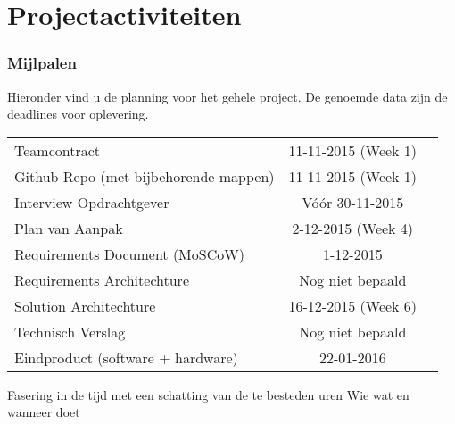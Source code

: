 \chapter{Projectactiviteiten}

\subsection{Mijlpalen}
Hieronder vind u de planning voor het gehele project. De genoemde data zijn de deadlines voor oplevering.
\begin{table}[]
\centering
\begin{tabular}{ l c r }
  Teamcontract & 11-11-2015 (Week 1) \\
  Github Repo (met bijbehorende mappen) & 11-11-2015 (Week 1) \\
  Interview Opdrachtgever & Vóór 30-11-2015 \\
  Plan van Aanpak & 2-12-2015 (Week 4) \\
  Requirements Document (MoSCoW) & 1-12-2015 \\
  Requirements Architechture & Nog niet bepaald \\
  Solution Architechture & 16-12-2015 (Week 6) \\
  Technisch Verslag	& Nog niet bepaald \\
  Eindproduct (software + hardware)	& 22-01-2016 \\
\end{tabular}
\end{table}

Fasering in de tijd met een schatting van de te besteden uren
Wie wat en wanneer doet